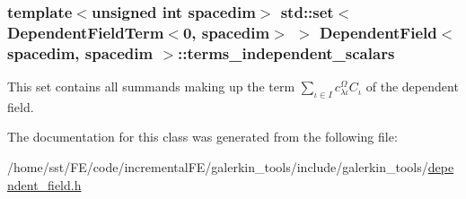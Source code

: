 \subsubsection[{\texorpdfstring{terms\+\_\+independent\+\_\+scalars}{terms_independent_scalars}}]{\setlength{\rightskip}{0pt plus 5cm}template$<$unsigned int spacedim$>$ std\+::set$<${\bf Dependent\+Field\+Term}$<$0, spacedim$>$ $>$ {\bf Dependent\+Field}$<$ spacedim, spacedim $>$\+::terms\+\_\+independent\+\_\+scalars\hspace{0.3cm}{\ttfamily [private]}}\hypertarget{class_dependent_field_3_01spacedim_00_01spacedim_01_4_a54061701af0eea90b02e56612f1491cc}{}\label{class_dependent_field_3_01spacedim_00_01spacedim_01_4_a54061701af0eea90b02e56612f1491cc}
This set contains all summands making up the term $\sum_{\iota \in I}c^\Omega_{\lambda\iota} C_\iota$ of the dependent field. 

The documentation for this class was generated from the following file\+:\begin{DoxyCompactItemize}
\item 
/home/sst/\+F\+E/code/incremental\+F\+E/galerkin\+\_\+tools/include/galerkin\+\_\+tools/\hyperlink{dependent__field_8h}{dependent\+\_\+field.\+h}\end{DoxyCompactItemize}

